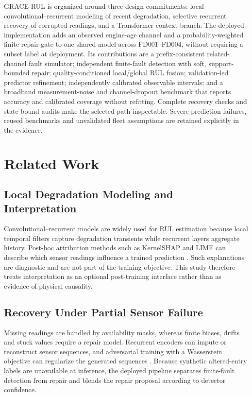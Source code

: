 \documentclass[conference]{IEEEtran}
\begin{document}
GRACE-RUL is organized around three design commitments: local
convolutional--recurrent modeling of recent degradation, selective recurrent
recovery of corrupted readings, and a Transformer context branch. The deployed
implementation adds an observed engine-age channel and a probability-weighted
finite-repair gate to one shared model across FD001--FD004, without requiring a
subset label at deployment. Its contributions
are a prefix-consistent related-channel fault simulator; independent finite-fault
detection with soft, support-bounded repair; quality-conditioned local/global
RUL fusion; validation-led predictor refinement; independently calibrated
observable intervals; and a broadband measurement-noise and channel-dropout
benchmark that reports accuracy and calibrated coverage without refitting.
Complete recovery checks and state-bound audits make the selected path
inspectable. Severe prediction failures, reused benchmarks and unvalidated fleet
assumptions are retained explicitly in the evidence.

\section{\textbf{Related Work}}
\label{sec:related_work}
\subsection{\textbf{Local Degradation Modeling and Interpretation}}
Convolutional--recurrent models are widely used for RUL estimation because local
temporal filters capture degradation transients while recurrent layers aggregate
history. Post-hoc attribution methods such as KernelSHAP and LIME can describe
which sensor readings influence a trained prediction
\cite{lundberg2017unified,ribeiro2016trust}. Such explanations are diagnostic and
are not part of the training objective. This study therefore treats
interpretation as an optional post-training interface rather than as evidence of
physical causality.

\subsection{\textbf{Recovery Under Partial Sensor Failure}}
Missing readings are handled by availability masks, whereas finite biases,
drifts and stuck values require a repair model. Recurrent encoders can impute or
reconstruct sensor sequences, and adversarial training with a Wasserstein
objective can regularize the generated sequences \cite{gulrajani2017improved}.
Because synthetic altered-entry labels are unavailable at inference, the
deployed pipeline separates finite-fault detection from repair and blends the
repair proposal according to detector confidence.
\end{document}
